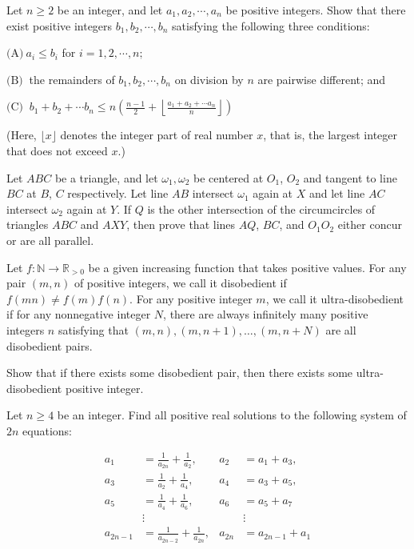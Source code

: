 \documentclass[11pt]{scrartcl}
\begin{document}
\begin{problem}[4777015574921577837]
	Let $n\ge 2$ be an integer, and let $a_1, a_2, \cdots , a_n$ be positive integers. Show that there exist positive integers $b_1, b_2, \cdots, b_n$ satisfying the following three conditions:

$\text{(A)} \ a_i\le b_i$ for $i=1, 2, \cdots , n;$

$\text{(B)} \ $ the remainders of $b_1, b_2, \cdots, b_n$ on division by $n$ are pairwise different; and

$\text{(C)} \ $ $b_1+b_2+\cdots b_n \le n\left(\frac{n-1}{2}+\left\lfloor \frac{a_1+a_2+\cdots a_n}{n}\right \rfloor \right)$

(Here, $\lfloor x \rfloor$ denotes the integer part of real number $x$, that is, the largest integer that does not exceed $x$.)
\end{problem}
\begin{problem}[4785409545704689551]
	Let $ABC$ be a triangle, and let $\omega_1,\omega_2$ be centered at $O_1$, $O_2$ and tangent to line $BC$ at $B$, $C$ respectively. Let line $AB$ intersect $\omega_1$ again at $X$ and let line $AC$ intersect $\omega_2$ again at $Y$. If $Q$ is the other intersection of the circumcircles of triangles $ABC$ and $AXY$, then prove that lines $AQ$, $BC$, and $O_1O_2$ either concur or are all parallel.
\end{problem}
\begin{problem}[4829488265746237263]
Let $f:\mathbb{N}\to\mathbb{R}_{>0}$ be a given increasing function that takes positive values. For any pair $(m,n)$ of positive integers, we call it disobedient if $f(mn)\neq f(m)f(n)$. For any positive integer $m$, we call it ultra-disobedient if for any nonnegative integer $N$, there are always infinitely many positive integers $n$ satisfying that $(m,n), (m,n+1),\ldots,(m,n+N)$ are all disobedient pairs.

Show that if there exists some disobedient pair, then there exists some ultra-disobedient positive integer.
\end{problem}
\begin{problem}[4835329555526569551]
Let $n \geq 4$ be an integer. Find all positive real solutions to the following system of $2n$ equations:

\begin{align*}
a_{1} &=\frac{1}{a_{2 n}}+\frac{1}{a_{2}}, & a_{2}&=a_{1}+a_{3}, \\
a_{3}&=\frac{1}{a_{2}}+\frac{1}{a_{4}}, & a_{4}&=a_{3}+a_{5}, \\
a_{5}&=\frac{1}{a_{4}}+\frac{1}{a_{6}}, & a_{6}&=a_{5}+a_{7} \\
&\vdots & &\vdots \\
a_{2 n-1}&=\frac{1}{a_{2 n-2}}+\frac{1}{a_{2 n}}, & a_{2 n}&=a_{2 n-1}+a_{1}
\end{align*}
\end{problem}
\end{document}
